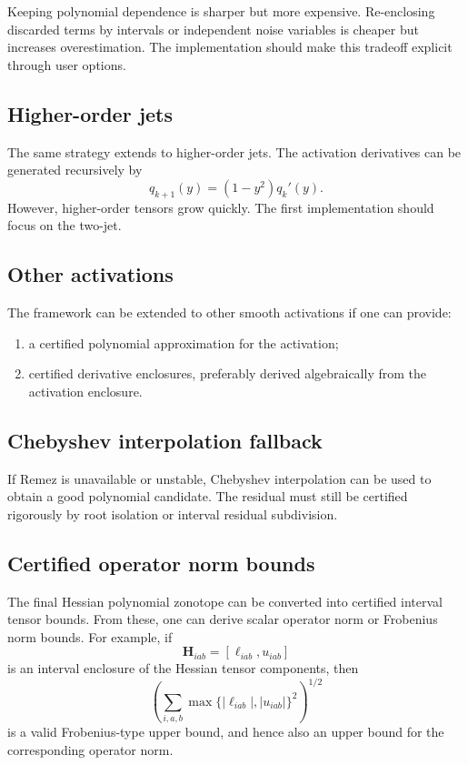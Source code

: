 \documentclass[11pt]{article}
\begin{document}
Keeping polynomial dependence is sharper but more expensive. Re-enclosing discarded terms by intervals or independent noise variables is cheaper but increases overestimation. The implementation should make this tradeoff explicit through user options.

\subsection{Higher-order jets}

The same strategy extends to higher-order jets. The activation derivatives can be generated recursively by
\[
    q_{k+1}(y)=(1-y^2)q_k'(y).
\]
However, higher-order tensors grow quickly. The first implementation should focus on the two-jet.

\subsection{Other activations}

The framework can be extended to other smooth activations if one can provide:
\begin{enumerate}[label=(\roman*)]
    \item a certified polynomial approximation for the activation;
    \item certified derivative enclosures, preferably derived algebraically from the activation enclosure.
\end{enumerate}

\subsection{Chebyshev interpolation fallback}

If Remez is unavailable or unstable, Chebyshev interpolation can be used to obtain a good polynomial candidate. The residual must still be certified rigorously by root isolation or interval residual subdivision.

\subsection{Certified operator norm bounds}

The final Hessian polynomial zonotope can be converted into certified interval tensor bounds. From these, one can derive scalar operator norm or Frobenius norm bounds. For example, if
\[
    \boldsymbol H_{iab}=[\ell_{iab},u_{iab}]
\]
is an interval enclosure of the Hessian tensor components, then
\[
    \left(
        \sum_{i,a,b}
        \max\{|\ell_{iab}|,|u_{iab}|\}^2
    \right)^{1/2}
\]
is a valid Frobenius-type upper bound, and hence also an upper bound for the corresponding operator norm.
\end{document}
